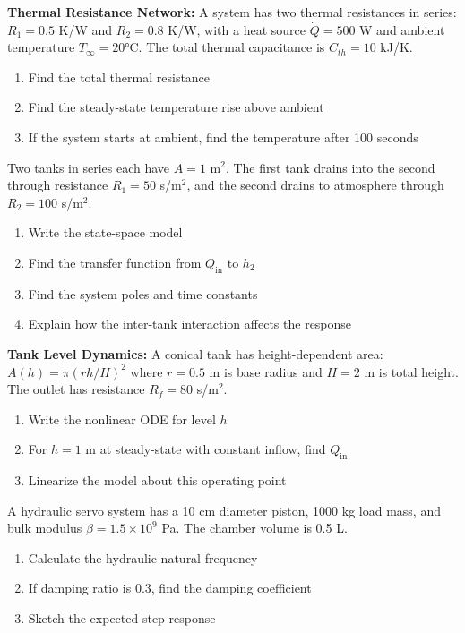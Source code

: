 \begin{exercise}
\textbf{Thermal Resistance Network:} A system has two thermal resistances in series: $R_1 = 0.5$ K/W and $R_2 = 0.8$ K/W, with a heat source $\dot{Q} = 500$ W and ambient temperature $T_\infty = 20$°C. The total thermal capacitance is $C_{th} = 10$ kJ/K.
\begin{enumerate}[label=(\alph*)]
    \item Find the total thermal resistance
    \item Find the steady-state temperature rise above ambient
    \item If the system starts at ambient, find the temperature after 100 seconds
\end{enumerate}
\end{exercise}

\begin{exercise}
Two tanks in series each have $A = 1$ m$^2$. The first tank drains into the second through resistance $R_1 = 50$ s/m$^2$, and the second drains to atmosphere through $R_2 = 100$ s/m$^2$.
\begin{enumerate}[label=(\alph*)]
    \item Write the state-space model
    \item Find the transfer function from $Q_{\text{in}}$ to $h_2$
    \item Find the system poles and time constants
    \item Explain how the inter-tank interaction affects the response
\end{enumerate}
\end{exercise}

\begin{exercise}
\textbf{Tank Level Dynamics:} A conical tank has height-dependent area: $A(h) = \pi(rh/H)^2$ where $r = 0.5$ m is base radius and $H = 2$ m is total height. The outlet has resistance $R_f = 80$ s/m$^2$.
\begin{enumerate}[label=(\alph*)]
    \item Write the nonlinear ODE for level $h$
    \item For $h = 1$ m at steady-state with constant inflow, find $Q_{\text{in}}$
    \item Linearize the model about this operating point
\end{enumerate}
\end{exercise}

\begin{exercise}
A hydraulic servo system has a 10 cm diameter piston, 1000 kg load mass, and bulk modulus $\beta = 1.5 \times 10^9$ Pa. The chamber volume is 0.5 L.
\begin{enumerate}[label=(\alph*)]
    \item Calculate the hydraulic natural frequency
    \item If damping ratio is 0.3, find the damping coefficient
    \item Sketch the expected step response
\end{enumerate}
\end{exercise}

